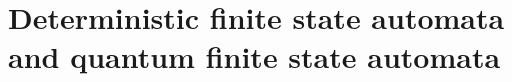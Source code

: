 \documentclass[../main.tex]{subfiles}
\begin{document}




\section{Deterministic finite state automata and quantum finite state automata}~\label{preliminaries}
\end{document}
